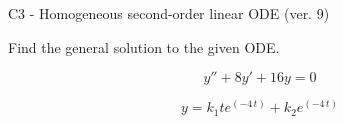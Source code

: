 \begin{exercise}
  \begin{exerciseTitle}C3 - Homogeneous second-order linear ODE (ver. 9)\end{exerciseTitle}
  \begin{exerciseStatement}
    
Find the general solution to the given ODE.

    
\[y''+8y'+16y = 0\]

  \end{exerciseStatement}
  \begin{exerciseAnswer}
    
\[y= k_{1} t e^{\left(-4 \, t\right)} + k_{2} e^{\left(-4 \, t\right)}\]

  \end{exerciseAnswer}
\end{exercise}
